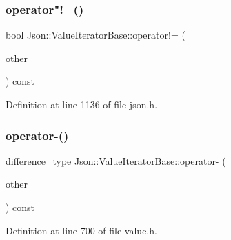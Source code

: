 \subsubsection{\texorpdfstring{operator"!=()}{operator!=()}\hspace{0.1cm}{\footnotesize\ttfamily [2/2]}}
{\footnotesize\ttfamily bool Json\+::\+Value\+Iterator\+Base\+::operator!= (\begin{DoxyParamCaption}\item[{const \hyperlink{class_json_1_1_value_iterator_base_a9d2a940d03ea06d20d972f41a89149ee}{Self\+Type} \&}]{other }\end{DoxyParamCaption}) const\hspace{0.3cm}{\ttfamily [inline]}}



Definition at line 1136 of file json.\+h.

\hypertarget{class_json_1_1_value_iterator_base_a98e254263fca5f1fc8fcac7bcb0260bf}{}\label{class_json_1_1_value_iterator_base_a98e254263fca5f1fc8fcac7bcb0260bf} 
\subsubsection{\texorpdfstring{operator-\/()}{operator-()}\hspace{0.1cm}{\footnotesize\ttfamily [1/2]}}
{\footnotesize\ttfamily \hyperlink{class_json_1_1_value_iterator_base_a4e44bf8cbd17ec8d6e2c185904a15ebd}{difference\+\_\+type} Json\+::\+Value\+Iterator\+Base\+::operator-\/ (\begin{DoxyParamCaption}\item[{const \hyperlink{class_json_1_1_value_iterator_base_a9d2a940d03ea06d20d972f41a89149ee}{Self\+Type} \&}]{other }\end{DoxyParamCaption}) const\hspace{0.3cm}{\ttfamily [inline]}}



Definition at line 700 of file value.\+h.

\hypertarget{class_json_1_1_value_iterator_base_a98e254263fca5f1fc8fcac7bcb0260bf}{}\label{class_json_1_1_value_iterator_base_a98e254263fca5f1fc8fcac7bcb0260bf} 
